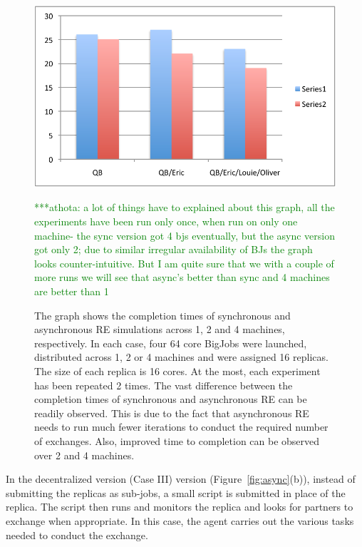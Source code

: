 \documentclass[a4paper,10pt]{article}
\newcommand{\athotanote}[1]{ {\textcolor{green} { ***athota: #1 }}}
\newcommand{\athotanote}[1]{}
\begin{document}
%
\begin{figure}
\centering
\includegraphics[scale=0.50]{figures/temp.pdf}
\caption{\small The graph shows the completion times of synchronous and asynchronous RE simulations across 1, 2 and 4 machines, respectively. In each case, four 64 core BigJobs were launched, distributed across 1, 2 or 4 machines and were assigned 16 replicas. The size of each replica is 16 cores. At the most, each experiment has been repeated 2 times. The vast difference between the completion times of synchronous and asynchronous RE can be  readily observed. This is due to the fact that asynchronous RE needs to run much fewer iterations to conduct the required number of exchanges. Also, improved time to completion can be observed over 2 and 4 machines.} \athotanote{a lot of things have to explained about this graph, all the experiments have been run only once, when run on only one machine- the sync version got 4 bjs eventually, but the async version got only 2; due to similar irregular availability of BJs the graph looks counter-intuitive. But I am quite sure that we with a couple of more runs we will see that async's better than sync and 4 machines are better than 1}
\label{fig:graph}
\vspace{-1em}
\end{figure}

 

In the decentralized version (Case III) version
(Figure~\ref{fig:async}(b)), instead of submitting the replicas as sub-jobs, a small script is
submitted in place of the replica. %
The script then runs and monitors the replica and looks for partners to exchange when appropriate. In this case, the agent carries out the various tasks needed to conduct the exchange. %
\end{document}
